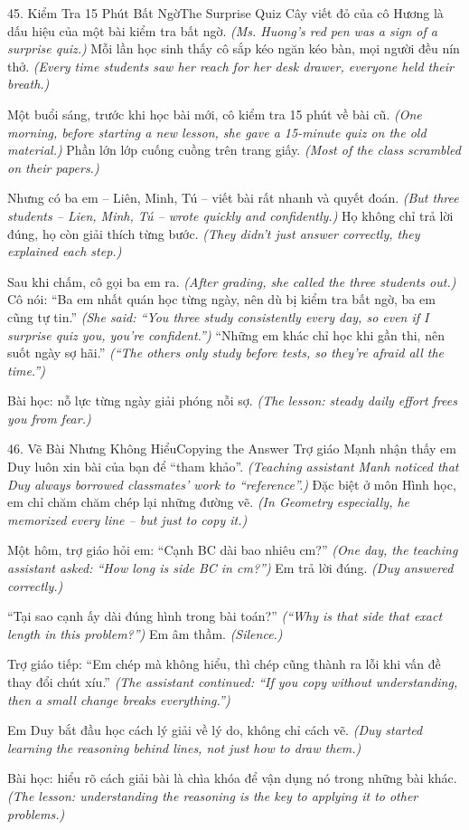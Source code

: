 \begin{truyen}{45. Kiểm Tra 15 Phút Bất Ngờ}{The Surprise Quiz}
Cây viết đỏ của cô Hương là dấu hiệu của một bài kiểm tra bất ngờ.
\textit{(Ms. Huong's red pen was a sign of a surprise quiz.)}
Mỗi lần học sinh thấy cô sắp kéo ngăn kéo bàn, mọi người đều nín thở.
\textit{(Every time students saw her reach for her desk drawer, everyone held their breath.)}

Một buổi sáng, trước khi học bài mới, cô kiểm tra 15 phút về bài cũ.
\textit{(One morning, before starting a new lesson, she gave a 15-minute quiz on the old material.)}
Phần lớn lớp cuống cuồng trên trang giấy.
\textit{(Most of the class scrambled on their papers.)}

Nhưng có ba em -- Liên, Minh, Tú -- viết bài rất nhanh và quyết đoán.
\textit{(But three students -- Lien, Minh, Tú -- wrote quickly and confidently.)}
Họ không chỉ trả lời đúng, họ còn giải thích từng bước.
\textit{(They didn't just answer correctly, they explained each step.)}

Sau khi chấm, cô gọi ba em ra.
\textit{(After grading, she called the three students out.)}
Cô nói: ``Ba em nhất quán học từng ngày, nên dù bị kiểm tra bất ngờ, ba em cũng tự tin.''
\textit{(She said: ``You three study consistently every day, so even if I surprise quiz you, you're confident.'')}
``Những em khác chỉ học khi gần thi, nên suốt ngày sợ hãi.''
\textit{(``The others only study before tests, so they're afraid all the time.'')}

Bài học: nỗ lực từng ngày giải phóng nỗi sợ.
\textit{(The lesson: steady daily effort frees you from fear.)}
\end{truyen}

\begin{truyen}{46. Vẽ Bài Nhưng Không Hiểu}{Copying the Answer}
Trợ giáo Mạnh nhận thấy em Duy luôn xin bài của bạn để ``tham khảo''.
\textit{(Teaching assistant Manh noticed that Duy always borrowed classmates' work to ``reference''.)}
Đặc biệt ở môn Hình học, em chỉ chăm chăm chép lại những đường vẽ.
\textit{(In Geometry especially, he memorized every line -- but just to copy it.)}

Một hôm, trợ giáo hỏi em: ``Cạnh BC dài bao nhiêu cm?''
\textit{(One day, the teaching assistant asked: ``How long is side BC in cm?'')}
Em trả lời đúng.
\textit{(Duy answered correctly.)}

``Tại sao cạnh ấy dài đúng hình trong bài toán?''
\textit{(``Why is that side that exact length in this problem?'')}
Em âm thầm.
\textit{(Silence.)}

Trợ giáo tiếp: ``Em chép mà không hiểu, thì chép cũng thành ra lỗi khi vấn đề thay đổi chút xíu.''
\textit{(The assistant continued: ``If you copy without understanding, then a small change breaks everything.'')}

Em Duy bắt đầu học cách lý giải về lý do, không chỉ cách vẽ.
\textit{(Duy started learning the reasoning behind lines, not just how to draw them.)}

Bài học: hiểu rõ cách giải bài là chìa khóa để vận dụng nó trong những bài khác.
\textit{(The lesson: understanding the reasoning is the key to applying it to other problems.)}
\end{truyen}

